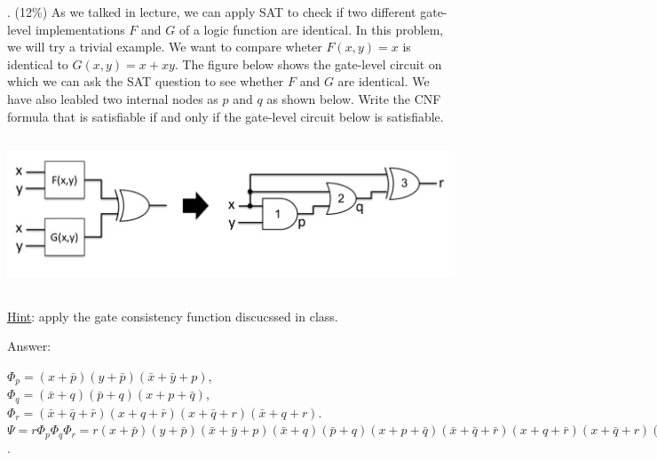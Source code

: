\documentclass[12pt]{article}
\begin{document}
    . (12\%) As we talked in lecture,
    we can apply SAT to check if two different gate-level implementations $F$ and $G$ of a logic function are identical.
    In this problem,
    we will try a trivial example.
    We want to compare wheter $F(x, y) = x$ is identical to $G(x, y) = x + xy$.
    The figure below shows the gate-level circuit on which we can ask the SAT question to see whether $F$ and $G$ are identical.
    We have also leabled two internal nodes as $p$ and $q$ as shown below.
    Write the CNF formula that is satisfiable if and only if the gate-level circuit below is satisfiable.
    \begin{center}
        \includegraphics[width = 6.50in, height = 1.80in]{figure3.png}
    \end{center}

    \noindent
    \underline{Hint}: apply the gate consistency function discucssed in class.

    \noindent
    Answer:

    \noindent
    $\Phi_{p} = (x + \bar{p})(y + \bar{p})(\bar{x} + \bar{y} + p)$,\\
    $\Phi_{q} = (\bar{x} + q)(\bar{p} + q)(x + p + \bar{q})$,\\
    $\Phi_{r} = (\bar{x} + \bar{q} + \bar{r})(x + q + \bar{r})(x + \bar{q} + r)(\bar{x} + q + r)$.\\
    $\Psi = r\Phi_{p}\Phi_{q}\Phi_{r}=r(x + \bar{p})(y + \bar{p})(\bar{x} + \bar{y} + p)(\bar{x} + q)(\bar{p} + q)(x + p + \bar{q})(\bar{x} + \bar{q} + \bar{r})(x + q + \bar{r})(x + \bar{q} + r)(\bar{x} + q + r)$.\\
\end{document}
